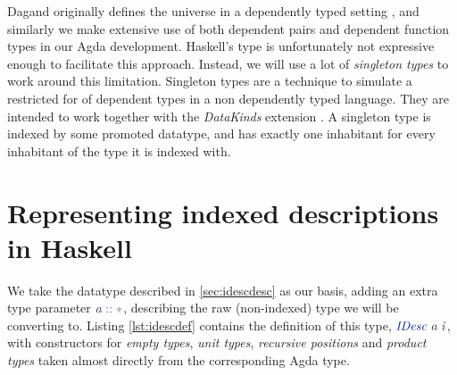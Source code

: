 \documentclass[a4paper,msc,twosized=semi]{uustthesis}
\let\oldemph\emph
\renewcommand\emph[1]{{\large\oldemph{#1}}}
\newcommand*{\mathcolor}{}
\def\mathcolor#1#{\mathcoloraux{#1}}
\newcommand*{\mathcoloraux}[3]{%
  \protect\leavevmode
  \begingroup
    \color#1{#2}#3%
  \endgroup
}
\newcommand{\HSSym}[1]{\mathcolor{hsblue4}{#1}}
\newcommand{\HSCon}[1]{\mathcolor{hsblue3}{\mathit{#1}}}
\newcommand{\HSVar}[1]{\mathcolor{hsblue5}{\mathit{#1}}}
\begin{document}
Dagand originally defines the universe in a dependently typed setting \cite
{dagand2013cosmology}, and similarly we make extensive use of both dependent pairs and dependent 
function types in our Agda development. Haskell's type is unfortunately not expressive enough 
to facilitate this approach. Instead, we will use a lot of \emph{singleton types} \cite
{eisenberg2013dependently} to work around this limitation. Singleton types are a 
technique to simulate a restricted for of dependent types in a non dependently typed 
language. They are intended to work together with the \emph{DataKinds} extension \cite
{ghcdocsdatakinds}. A singleton type is indexed by some promoted datatype, and has 
exactly one inhabitant for every inhabitant of the type it is indexed with.   

\section{Representing indexed descriptions in Haskell}

  We take the datatype described in \cref{sec:idescdesc} as our basis, adding an extra 
  type parameter \ensuremath{\HSVar{a}\HSSym{::}\HSSym{*}}, describing the raw (non-indexed) type we will be 
  converting to. Listing \ref{lst:idescdef} contains the definition of this type, \ensuremath{\HSCon{IDesc}\;\HSVar{a}\;\HSVar{i}}, with constructors for \emph{empty types}, \emph{unit types}, \emph{recursive 
  positions} and \emph{product types} taken almost directly from the corresponding 
  Agda type. 
\end{document}
